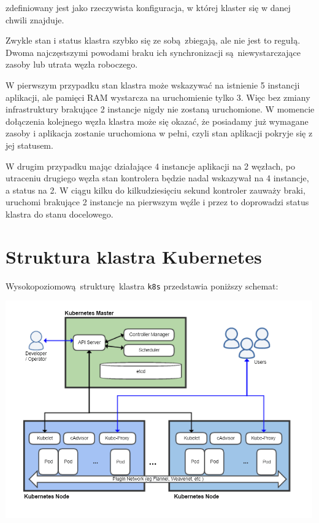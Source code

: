 \documentclass[a4paper,12pt,twoside,openany]{report}
\newcommand{\passthrough}[1]{#1}
\begin{document}
zdefiniowany jest jako rzeczywista konfiguracja, w której klaster się w
danej chwili znajduje.

Zwykle stan i status klastra szybko się ze sobą~zbiegają, ale nie jest
to regułą. Dwoma najczęstszymi powodami braku ich synchronizacji
są~niewystarczające zasoby lub utrata węzła roboczego.

W pierwszym przypadku stan klastra może wskazywać na istnienie 5
instancji aplikacji, ale pamięci RAM wystarcza na uruchomienie tylko 3.
Więc bez zmiany infrastruktury brakujące 2 instancje nigdy nie zostaną
uruchomione. W momencie dołączenia kolejnego węzła klastra może się
okazać, że posiadamy już wymagane zasoby i aplikacja zostanie
uruchomiona w pełni, czyli stan aplikacji pokryje się z jej statusem.

W drugim przypadku mając działające 4 instancje aplikacji na 2 węzłach,
po utraceniu drugiego węzła stan kontrolera będzie nadal wskazywał na 4
instancje, a status na 2. W ciągu kilku do kilkudziesięciu sekund
kontroler zauważy braki, uruchomi brakujące 2 instancje na pierwszym
węźle i przez to doprowadzi status klastra do stanu docelowego.

\hypertarget{struktura-klastra-kubernetes}{%
\section{Struktura klastra
Kubernetes}\label{struktura-klastra-kubernetes}}

Wysokopoziomową~strukturę~klastra \passthrough{\lstinline!k8s!}
przedstawia poniższy schemat:

\includegraphics[width=5.20833in,height=3.6875in]{assets/kubernetes-architecture.png}\\
\end{document}
